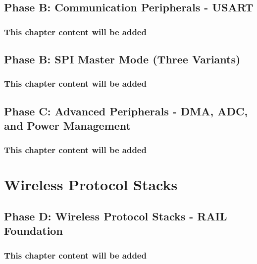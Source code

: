 \documentclass[11pt,a4paper,twoside,openright]{book}
\begin{document}
\chapter{Phase B: Communication Peripherals - USART}
\label{ch:chapter-06}
\section*{This chapter content will be added}
\clearpage



\chapter{Phase B: SPI Master Mode (Three Variants)}
\label{ch:chapter-08}
\section*{This chapter content will be added}
\clearpage

\chapter{Phase C: Advanced Peripherals - DMA, ADC, and Power Management}
\label{ch:chapter-09}
\section*{This chapter content will be added}
\clearpage

\part{Wireless Protocol Stacks}
\label{part:wireless}

\chapter{Phase D: Wireless Protocol Stacks - RAIL Foundation}
\label{ch:chapter-10}
\section*{This chapter content will be added}
\clearpage
\end{document}
